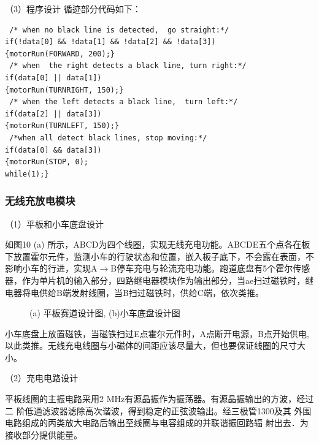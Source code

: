 \documentclass[UTF8]{ctexart}
\begin{document}
（3）程序设计
循迹部分代码如下：
\begin{lstlisting}
 /* when no black line is detected,  go straight:*/
if(!data[0] && !data[1] && !data[2] && !data[3])  
{motorRun(FORWARD, 200);}
 /* when  the right detects a black line, turn right:*/
if(data[0] || data[1])  
{motorRun(TURNRIGHT, 150);}
 /* when the left detects a black line,  turn left:*/
if(data[2] || data[3]) 
{motorRun(TURNLEFT, 150);}
 /*when all detect black lines, stop moving:*/
if(data[0] && data[3])  
{motorRun(STOP, 0);
while(1);}
\end{lstlisting}

\subsubsection{无线充放电模块}
（1）平板和小车底盘设计

如图10 (a) 所示，ABCD为四个线圈，实现无线充电功能。ABCDE五个点各在板下放置霍尔元件，监测小车的行驶状态和位置，嵌入板子底下，不会露在表面，不影响小车的行进，实现A$ \longrightarrow $B停车充电与轮流充电功能。跑道底盘有5个霍尔传感器，作为单片机的输入部分，四路继电器模块作为输出部分，当ae扫过磁铁时，继电器将电供给B端发射线圈，当B扫过磁铁时，供给C端，依次类推。
\begin{figure}[H]   
	\centering	  
	\label{1a}\hfil
	\label{1b}
	\caption{ (a) 平板赛道设计图, (b)小车底盘设计图}
	\label{fig10} 
\end{figure}


小车底盘上放置磁铁，当磁铁扫过E点霍尔元件时，A点断开电源，B点开始供电,以此类推。无线充电线圈与小磁体的间距应该尽量大，但也要保证线圈的尺寸大小。

（2）充电电路设计

平板线圈的主振电路采用2 MHz有源晶振作为振荡器。有源晶振输出的方波，经过二	阶低通滤波器滤除高次谐波，得到稳定的正弦波输出。经三极管1300及其	外围电路组成的丙类放大电路后输出至线圈与电容组成的并联谐振回路辐	射出去．为接收部分提供能量。
\end{document}
